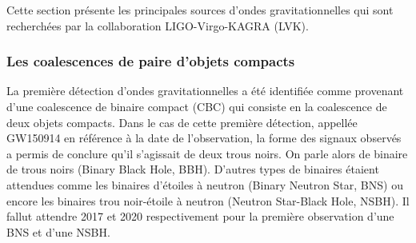 Cette section présente les principales sources d'ondes gravitationnelles qui sont recherchées par la collaboration LIGO-Virgo-KAGRA (LVK).

\subsubsection*{Les coalescences de paire d'objets compacts}

La première détection d'ondes gravitationnelles a été identifiée comme provenant d'une coalescence de binaire compact (CBC) qui consiste en la coalescence de deux objets compacts.
Dans le cas de cette première détection, appellée GW150914 en référence à la date de l'observation, la forme des signaux observés a permis de conclure qu'il s'agissait de deux trous noirs.
On parle alors de binaire de trous noirs (Binary Black Hole, BBH).
D'autres types de binaires étaient attendues comme les binaires d'étoiles à neutron (Binary Neutron Star, BNS) ou encore les binaires trou noir-étoile à neutron (Neutron Star-Black Hole, NSBH).
Il fallut attendre 2017 et 2020 respectivement pour la première observation d'une BNS et d'une NSBH.

